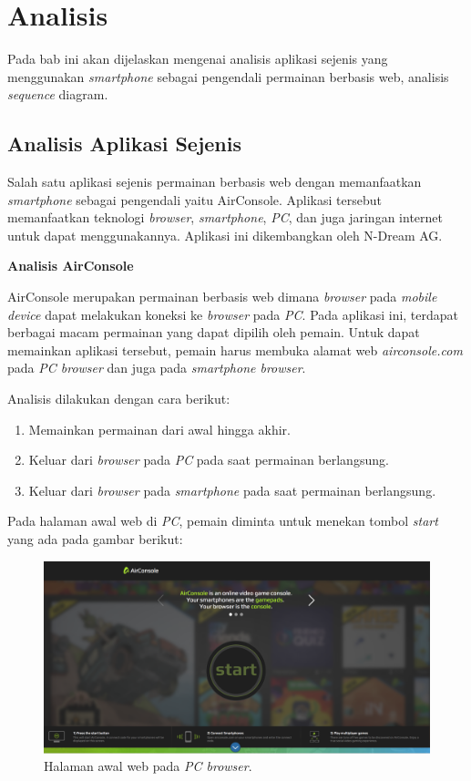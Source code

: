 \chapter{Analisis}
\label{chap:analisis}

Pada bab ini akan dijelaskan mengenai analisis aplikasi sejenis yang menggunakan \textit{smartphone} sebagai pengendali permainan berbasis web, analisis \textit{sequence} diagram.

\section{Analisis Aplikasi Sejenis}
\label{sec:AirConsole}

Salah satu aplikasi sejenis permainan berbasis web dengan memanfaatkan \textit{smartphone} sebagai pengendali yaitu AirConsole. Aplikasi tersebut memanfaatkan teknologi \textit{browser}, \textit{smartphone}, \textit{PC}, dan juga jaringan internet untuk dapat menggunakannya. Aplikasi ini dikembangkan oleh N-Dream AG.

\textbf{Analisis AirConsole} 

AirConsole merupakan permainan berbasis web dimana \textit{browser} pada \textit{mobile device} dapat melakukan koneksi ke \textit{browser} pada  \textit{PC}. Pada aplikasi ini, terdapat berbagai macam permainan yang dapat dipilih oleh pemain. Untuk dapat memainkan aplikasi tersebut, pemain harus membuka alamat web \textit{airconsole.com} pada \textit{PC browser} dan juga pada \textit{smartphone browser}.

Analisis dilakukan dengan cara berikut:
\begin{enumerate}
	\item Memainkan permainan dari awal hingga akhir.
	\item Keluar dari \textit{browser} pada \textit{PC} pada saat permainan berlangsung.
	\item Keluar dari \textit{browser} pada \textit{smartphone} pada saat permainan berlangsung.
\end{enumerate}
Pada halaman awal web di \textit{PC}, pemain diminta untuk menekan tombol \textit{start} yang ada pada gambar berikut: 

\begin{figure}[H]
	\centering
	\includegraphics[scale=0.2]{Gambar/con1_home1}
	\caption{Halaman awal web pada \textit{PC browser}.}
	\label{fig:16_con1_home1}
\end{figure}

